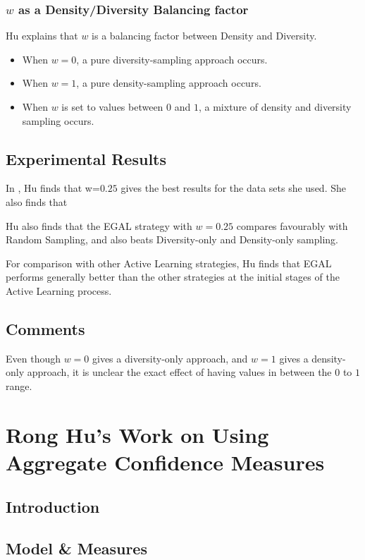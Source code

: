 \documentclass[a4paper,11pt]{report}
\begin{document}
\subsubsection{$w$ as a Density/Diversity Balancing factor}
Hu explains that $w$ is a balancing factor between Density and Diversity\cite{Hu2010}. 

\begin{itemize}
	\item When $w=0$, a pure diversity-sampling approach occurs. 
	\item When $w=1$, a pure density-sampling approach occurs. 
	\item When $w$ is set to values between $0$ and $1$, a mixture of density and diversity sampling occurs.
\end{itemize}

\subsection{Experimental Results}
In \citet{Hu2011}, Hu finds that w=$0.25$ gives the best results for the data sets she used. She also finds that 

Hu also finds that the EGAL strategy with $w=0.25$ compares favourably with Random Sampling, and also beats Diversity-only and Density-only sampling.

For comparison with other Active Learning strategies, Hu finds that EGAL performs generally better than the other strategies at the initial stages of the Active Learning process.

\subsection{Comments}
Even though $w=0$ gives a diversity-only approach, and $w=1$ gives a density-only approach, it is unclear the exact effect of having values in between the $0$ to $1$ range.

\section{Rong Hu's Work on Using Aggregate Confidence Measures}
\subsection{Introduction}

\subsection{Model \& Measures}
\end{document}
